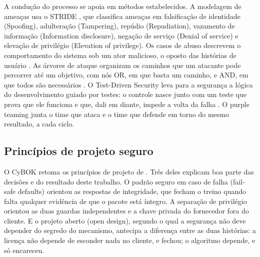 A condução do processo se apoia em métodos estabelecidos. A modelagem de ameaças usa o STRIDE \parencite{shostack2014}, que classifica ameaças em falsificação de identidade (Spoofing), adulteração (Tampering), repúdio (Repudiation), vazamento de informação (Information disclosure), negação de serviço (Denial of service) e elevação de privilégio (Elevation of privilege). Os casos de abuso descrevem o comportamento do sistema sob um ator malicioso, o oposto das histórias de usuário \parencite{sindre2005,mcgraw2006}. As árvores de ataque organizam os caminhos que um atacante pode percorrer até um objetivo, com nós OR, em que basta um caminho, e AND, em que todos são necessários \parencite{schneier1999}. O Test-Driven Security leva para a segurança a lógica do desenvolvimento guiado por testes: o controle nasce junto com um teste que prova que ele funciona e que, dali em diante, impede a volta da falha \parencite{vehent2018}. O purple teaming junta o time que ataca e o time que defende em torno do mesmo resultado, a cada ciclo.

\subsection{Princípios de projeto seguro}

O CyBOK retoma os princípios de projeto de \textcite{saltzer1975}. Três deles explicam boa parte das decisões e do resultado deste trabalho. O padrão seguro em caso de falha (fail-safe defaults) orientou as respostas de integridade, que fecham o treino quando falta qualquer evidência de que o pacote está íntegro. A separação de privilégio orientou as duas guardas independentes e a chave privada do fornecedor fora do cliente. E o projeto aberto (open design), segundo o qual a segurança não deve depender do segredo do mecanismo, antecipa a diferença entre as duas histórias: a licença não depende de esconder nada no cliente, e fechou; o algoritmo depende, e só encareceu.
